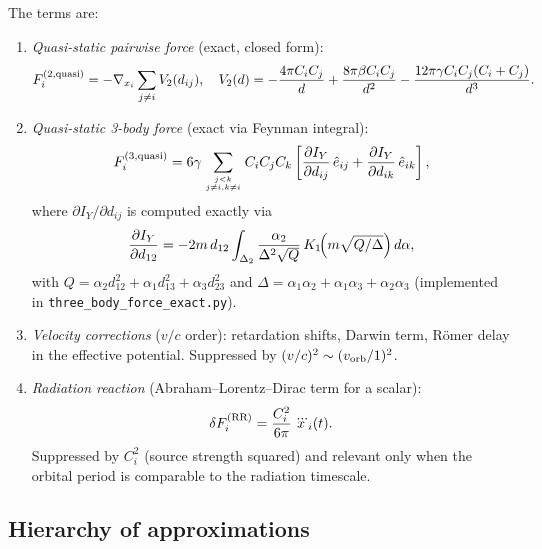 The terms are:
\begin{enumerate}
\item \emph{Quasi-static pairwise force} (exact, closed form):
\begin{equation}
F_i^{(2,\rm quasi)}
= -\nabla_{x_i}\sum_{j\ne i} V_2(d_{ij}),\quad
V_2(d) = -\frac{4\pi C_i C_j}{d} + \frac{8\pi\beta C_i C_j}{d^2}
         - \frac{12\pi\gamma C_i C_j(C_i+C_j)}{d^3}.
\end{equation}

\item \emph{Quasi-static 3-body force} (exact via Feynman integral):
\begin{equation}
F_i^{(3,\rm quasi)}
= 6\gamma\sum_{j<k\atop j\ne i,k\ne i} C_i C_j C_k
\left[
\frac{\partial I_Y}{\partial d_{ij}}\,\hat e_{ij}
+ \frac{\partial I_Y}{\partial d_{ik}}\,\hat e_{ik}
\right],
\end{equation}
where $\partial I_Y/\partial d_{ij}$ is computed exactly via
\begin{equation}
\frac{\partial I_Y}{\partial d_{12}}
=
-2m\,d_{12}
\int_{\Delta_2}
\frac{\alpha_2}{\Delta^2 \sqrt{Q}}\,K_1\!\Bigl(m\sqrt{Q/\Delta}\Bigr)\,d\alpha,
\label{eq:exact_dI_dd}
\end{equation}
with $Q = \alpha_2 d_{12}^2 + \alpha_1 d_{13}^2 + \alpha_3 d_{23}^2$
and $\Delta = \alpha_1\alpha_2+\alpha_1\alpha_3+\alpha_2\alpha_3$
(implemented in \texttt{three\_body\_force\_exact.py}).

\item \emph{Velocity corrections} ($v/c$ order): retardation shifts, Darwin term,
  Römer delay in the effective potential.  Suppressed by $(v/c)^2\sim (v_{\rm orb}/1)^2$.

\item \emph{Radiation reaction} (Abraham--Lorentz--Dirac term for a scalar):
\begin{equation}
\delta F_i^{(\rm RR)}
= \frac{C_i^2}{6\pi}\,\dddot x_i(t).
\end{equation}
  Suppressed by $C_i^2$ (source strength squared) and relevant only when
  the orbital period is comparable to the radiation timescale.
\end{enumerate}

\subsection{Hierarchy of approximations}

